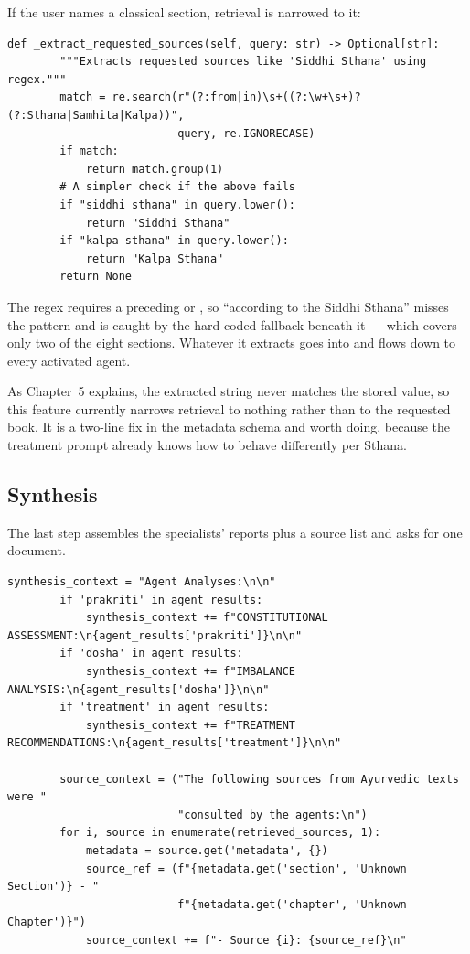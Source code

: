 If the user names a classical section, retrieval is narrowed to it:

\begin{lstlisting}[style=py,firstnumber=14]
    def _extract_requested_sources(self, query: str) -> Optional[str]:
        """Extracts requested sources like 'Siddhi Sthana' using regex."""
        match = re.search(r"(?:from|in)\s+((?:\w+\s+)?(?:Sthana|Samhita|Kalpa))",
                          query, re.IGNORECASE)
        if match:
            return match.group(1)
        # A simpler check if the above fails
        if "siddhi sthana" in query.lower():
            return "Siddhi Sthana"
        if "kalpa sthana" in query.lower():
            return "Kalpa Sthana"
        return None
\end{lstlisting}

The regex requires a preceding  or , so ``according to the Siddhi Sthana'' misses the pattern and is caught by the hard-coded fallback beneath it --- which covers only two of the eight sections. Whatever it extracts goes into  and flows down to every activated agent.

As Chapter~5 explains, the extracted string never matches the stored  value, so this feature currently narrows retrieval to nothing rather than to the requested book. It is a two-line fix in the metadata schema and worth doing, because the treatment prompt already knows how to behave differently per Sthana.

\subsection{Synthesis}

The last step assembles the specialists' reports plus a source list and asks for one document.

\begin{lstlisting}[style=py,firstnumber=87]
        synthesis_context = "Agent Analyses:\n\n"
        if 'prakriti' in agent_results:
            synthesis_context += f"CONSTITUTIONAL ASSESSMENT:\n{agent_results['prakriti']}\n\n"
        if 'dosha' in agent_results:
            synthesis_context += f"IMBALANCE ANALYSIS:\n{agent_results['dosha']}\n\n"
        if 'treatment' in agent_results:
            synthesis_context += f"TREATMENT RECOMMENDATIONS:\n{agent_results['treatment']}\n\n"

        source_context = ("The following sources from Ayurvedic texts were "
                          "consulted by the agents:\n")
        for i, source in enumerate(retrieved_sources, 1):
            metadata = source.get('metadata', {})
            source_ref = (f"{metadata.get('section', 'Unknown Section')} - "
                          f"{metadata.get('chapter', 'Unknown Chapter')}")
            source_context += f"- Source {i}: {source_ref}\n"
\end{lstlisting}

